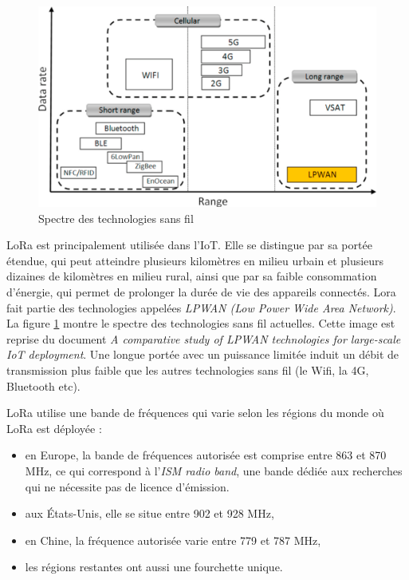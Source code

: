 \begin{figure}[h]
\centering

\includegraphics[scale=0.5]{images/lpwan.png}
\caption{Spectre des technologies sans fil}\label{term101}
\end{figure}


LoRa est principalement utilisée dans l'IoT. Elle se distingue par sa portée étendue, qui peut atteindre plusieurs kilomètres en milieu urbain et plusieurs dizaines de kilomètres en milieu rural, ainsi que par sa faible consommation d'énergie, qui permet de prolonger la durée de vie des appareils connectés. Lora fait partie des technologies appelées \textit{LPWAN (Low Power Wide
 Area Network)}. La figure \ref{term101} montre le spectre des technologies sans fil actuelles. Cette image est reprise du document \textit{A comparative study of LPWAN technologies for large-scale IoT deployment}\cite{lpwan1}. Une longue portée avec un puissance limitée induit un débit de transmission plus faible que les autres technologies sans fil (le Wifi, la 4G, Bluetooth etc).

\vspace{0.1cm}

LoRa utilise une bande de fréquences qui varie selon les régions du monde où LoRa est déployée :

\vspace{0.1cm}

\begin{itemize}
\item en Europe, la bande de fréquences autorisée est comprise entre 863 et 870 MHz, ce qui correspond à l'\textit{ISM radio band}, une bande dédiée aux recherches qui ne nécessite pas de licence d'émission.
\item aux États-Unis, elle se situe entre 902 et 928 MHz,
\item en Chine, la fréquence autorisée varie entre 779 et 787 MHz,
\item les régions restantes ont aussi une fourchette unique.
\end{itemize}

